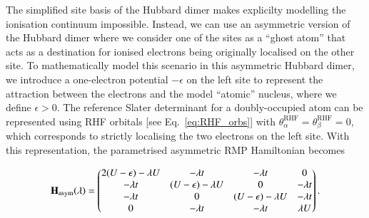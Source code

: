 \documentclass[aps,prb,reprint,noshowkeys,superscriptaddress]{revtex4-1}
\newcommand{\bH}{\mathbf{H}}
\begin{document}
The simplified site basis of the Hubbard dimer makes explicilty modelling the ionisation continuum impossible.
Instead, we can use an asymmetric version of the Hubbard dimer \cite{Carrascal_2015,Carrascal_2018} 
where we consider one of the sites as a ``ghost atom'' that acts as a 
destination for ionised electrons being originally localised on the other site.
To mathematically model this scenario in this asymmetric Hubbard dimer, we introduce a one-electron potential $-\epsilon$ on the left site to 
represent the attraction between the electrons and the model ``atomic'' nucleus, where we define $\epsilon > 0$.
The reference Slater determinant for a doubly-occupied atom can be represented using RHF
orbitals [see Eq.~\eqref{eq:RHF_orbs}] with $\theta_{\alpha}^{\text{RHF}} = \theta_{\beta}^{\text{RHF}} = 0$, 
which corresponds to strictly localising the two electrons on the left site.
With this representation, the parametrised asymmetric RMP Hamiltonian becomes
\begin{widetext}
\begin{equation}
\label{eq:H_asym}
\bH_\text{asym}\qty(\lambda) = 
\begin{pmatrix}
    2(U-\epsilon) - \lambda U &	-\lambda t				 &	-\lambda t	            &	0	        \\
    -\lambda t				  &	(U-\epsilon) - \lambda U &	0		                &	-\lambda t	\\
    -\lambda t				  &	0			             &	(U-\epsilon) -\lambda U	&	-\lambda t	\\
    0 				          &	-\lambda t 	 			 &	-\lambda t              &	\lambda U	\\
\end{pmatrix}.
\end{equation}
\end{widetext}
\end{document}
